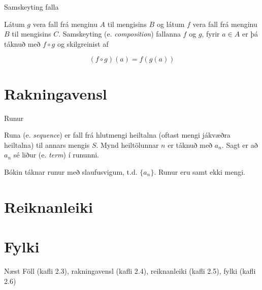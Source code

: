 \documentclass{beamer}
\begin{document}
\begin{frame}{Samskeyting falla}
\begin{tcolorbox}[title=Samskeyting falla]
Látum $g$ vera fall frá menginu $A$ til mengisins $B$ og látum $f$ vera fall frá menginu $B$ til mengisins $C$. Samskeyting (e. \emph{composition}) fallanna $f$ og $g$, fyrir $a \in A$ er þá táknuð með $f \circ g$ og skilgreinist af

\[
 (f \circ g)(a) = f(g(a))
\]

\end{tcolorbox}

\end{frame}


\section{Rakningavensl}

\begin{frame}{Runur}
\begin{tcolorbox}[title=Runur]
Runa (e. \emph{sequence}) er fall frá hlutmengi heiltalna (oftast mengi jákvæðra heiltalna) til annars mengis $S$. Mynd heiltölunnar $n$ er táknuð með $a_n$. Sagt er að $a_n$ sé liður (e. \emph{term}) í rununni.
\end{tcolorbox}
Bókin táknar runur með slaufusvigum, t.d. $\{a_n\}$. Runur eru samt ekki mengi.
\end{frame}


\section{Reiknanleiki}

\section{Fylki}

\begin{frame}{Næst}
Föll (kafli 2.3), rakningavensl (kafli 2.4), reiknanleiki (kafli 2.5), fylki (kafli 2.6)
\end{frame}
\end{document}
